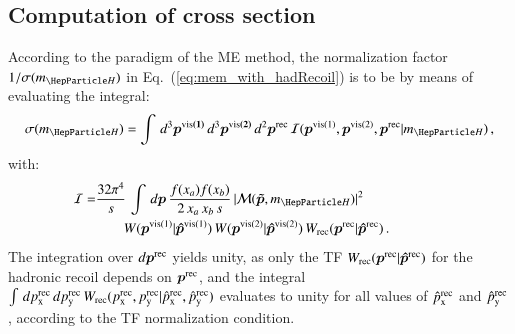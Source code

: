 \subsection{Computation of cross section}
\label{sec:mem_xSection}

According to the paradigm of the ME method, the normalization factor
$1/\sigma(m_{\PHiggs})$ in Eq.~(\ref{eq:mem_with_hadRecoil}) is to be 
by means of evaluating the integral:
\begin{equation}
\sigma(m_{\PHiggs}) =
\int \, d^{3}\bm{p^{\vis(1)}} \, d^{3}\bm{p^{\vis(2)}} \,
d^{2}\bm{p^{\rec}} \, \mathcal{I}(\bm{p}^{\vis(1)},\bm{p}^{\vis(2)},\bm{p^{\rec}}|m_{\PHiggs}) \, ,
\label{eq:xSection}
\end{equation}
with:
\begin{align}
\mathcal{I} = & \frac{32\pi^{4}}{s} \, \int \, d\bm{p} \,
\frac{f(x_{a}) f(x_{b})}{2 \, x_{a} \, x_{b} \, s} \, \vert \mathcal{M}(\bm{\tilde{p}},m_{\PHiggs}) \vert^{2} \, \hspace{2cm} \nonumber \\
& \qquad W(\bm{p}^{\vis(1)}|\bm{\hat{p}}^{\vis(1)}) \, W(\bm{p}^{\vis(2)}|\bm{\hat{p}}^{\vis(2)}) \, W_{\rec}( \bm{p^{\rec}} | \phat^{\rec} ) \, .
\label{eq:I}
\end{align}
The integration over $d\bm{p^{\textrm{rec}}}$ yields unity,
as only the TF $W_{\textrm{rec}}( \bm{p^{\textrm{rec}}} | \bm{\hat{p}}^{\textrm{rec}} )$ for the hadronic recoil 
depends on $\bm{p^{\textrm{rec}}}$,
and the integral $\int \, dp_{\textrm{x}}^{\textrm{rec}} \, dp_{\textrm{y}}^{\textrm{rec}} \, W_{\textrm{rec}}(
p_{\textrm{x}}^{\textrm{rec}}, p_{\textrm{y}}^{\textrm{rec}} | \hat{p}_{\textrm{x}}^{\textrm{rec}}, \hat{p}_{\textrm{y}}^{\textrm{rec}} )$ evaluates to unity for all values of $\hat{p}_{\textrm{x}}^{\textrm{rec}}$ and $\hat{p}_{\textrm{y}}^{\textrm{rec}}$,
according to the TF normalization condition.

